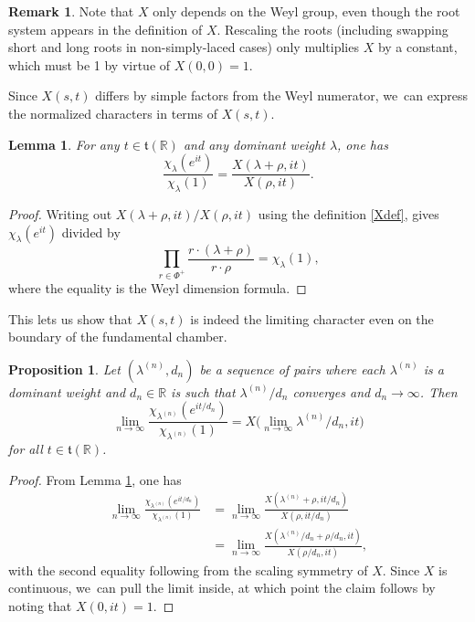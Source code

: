 \documentclass[JEP,XML,SOM,Unicode,NoFloatCountersInSection,published]{cedram}
\newtheorem{lem}[equation]{Lemma}
\newtheorem{prop}[equation]{Proposition}
\theoremstyle{definition}
\newtheorem{rmk}[equation]{Remark}
\let\la\lambda
\newcommand{\mft}{\mathfrak{t}}
\newcommand{\R}{\mathbb{R}}
\begin{document}
\begin{rmk}
Note that $X$ only depends on the Weyl group, even though the root system appears in the definition of $X$.
Rescaling the roots (including
swapping short and long roots in non-simply-laced cases) only
multiplies $X$ by a constant, which must be 1 by virtue of $X(0,0)=1$.
\end{rmk}

Since $X(s,t)$ differs by simple factors from the Weyl numerator, we~can
express the normalized characters in terms of $X(s,t)$.

\begin{lem} \label{X.dom}
For any $t\in \mft(\R)$ and any dominant weight $\lambda$, one has
\[
\frac{\chi_{\lambda}(e^{it})}{\chi_{\lambda}(1)}
=
\frac{X(\lambda+\rho,it)}{X(\rho,it)}.
\]
\end{lem}

\begin{proof}
Writing out $X(\lambda+\rho, it)/X(\rho, it)$ using the definition \eqref{Xdef}, gives $\chi_\lambda(e^{it})$ divided by
\[
\prod_{r\in \Phi^+} \frac{r\cdot (\lambda+\rho)}{r\cdot \rho} = \chi_\la(1),
\]
where the equality is the Weyl dimension formula.
\end{proof}

This lets us show that $X(s,t)$ is indeed the limiting character even on
the boundary of the fundamental chamber.

\begin{prop} \label{167}
Let $(\lambda^{(n)},d_n)$ be a sequence of pairs where each $\lambda^{(n)}$ is a dominant weight and $d_n \in \R$ is such that
$\lambda^{(n)}/d_n$ converges and $d_n \to \infty$. Then
\[
\lim_{n\to\infty}
\frac{\chi_{\lambda^{(n)}}(e^{it/d_n})}{\chi_{\lambda^{(n)}}(1)}
=
X\bigl(\lim_{n\to\infty} \lambda^{(n)}/d_n,it \bigr)
\]
for all $t\in \mft(\R)$.
\end{prop}

\begin{proof}
From Lemma \ref{X.dom}, one has
\begin{align*}
\lim_{n\to\infty}
\frac{\chi_{\lambda^{(n)}}(e^{it/d_n})}{\chi_{\lambda^{(n)}}(1)}
& =
\lim_{n\to\infty}
\frac{X(\lambda^{(n)}+\rho,it/d_n)}{X(\rho,it/d_n)} \\
&=
\lim_{n\to\infty}
\frac{X(\lambda^{(n)}/d_n+\rho/d_n,it)}{X(\rho/d_n,it)},
\end{align*}
with the second equality following from the scaling symmetry of $X$.
Since $X$ is continuous, we~can pull the limit inside, at which point
the claim follows by noting that $X(0,it)=1$.
\end{proof}
\end{document}
